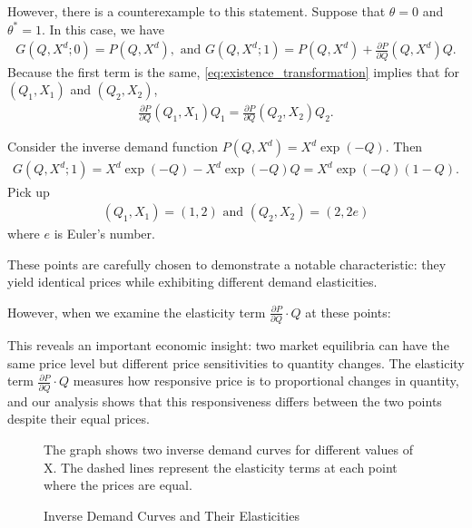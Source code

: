 \documentclass[11pt, a4paper]{article}
\theoremstyle{remark}
\begin{document}
However, there is a counterexample to this statement.
Suppose that $\theta = 0$ and $\theta^{*} = 1$.
In this case, we have
\begin{align}
    G(Q, X^{d};0) = P(Q,X^{d}),\text{ and }  G(Q, X^{d};1) =  P(Q, X^d) + \frac{\partial P}{\partial Q}(Q, X^d) Q.
\end{align}
Because the first term is the same,  \eqref{eq:existence_transformation} implies that for  $(Q_1, X_1)$ and $(Q_2, X_2)$,
\begin{align}
    \frac{\partial P}{\partial Q}(Q_1, X_1)Q_1 = \frac{\partial P}{\partial Q}(Q_2, X_2)Q_2.
\end{align}


Consider the inverse demand function $P(Q,X^{d}) = X^{d}\exp(-Q)$.
Then
\begin{align}
    G(Q,X^{d}; 1) = X^{d}\exp(-Q) - X^{d}\exp(-Q)Q = X^{d}\exp(-Q) (1 - Q). 
\end{align}
Pick up
\begin{align}
    (Q_1, X_1) = (1, 2) \text{ and } (Q_2, X_2) = (2, 2e)
\end{align}
where $e$ is Euler's number.




These points are carefully chosen to demonstrate a notable characteristic: they yield identical prices while exhibiting different demand elasticities. 




However, when we examine the elasticity term $\frac{\partial P}{\partial Q} \cdot Q$ at these points:


This reveals an important economic insight: two market equilibria can have the same price level but different price sensitivities to quantity changes. The elasticity term $\frac{\partial P}{\partial Q} \cdot Q$ measures how responsive price is to proportional changes in quantity, and our analysis shows that this responsiveness differs between the two points despite their equal prices.




\begin{figure}[h]
\caption{Inverse Demand Curves and Their Elasticities}
\label{fig:demand_curves}
The graph shows two inverse demand curves for different values of X. The dashed lines represent the elasticity terms at each point where the prices are equal.
\end{figure}
\end{document}
